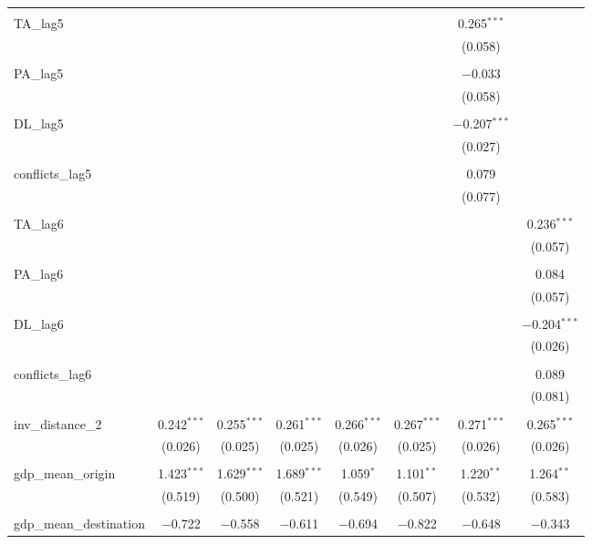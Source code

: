 \begin{table}[!htbp]
\begin{tabular}{@{\extracolsep{5pt}}lccccccc}
  & & & & & & & \\ 
 TA\_lag5 &  &  &  &  &  & 0.265$^{***}$ &  \\ 
  &  &  &  &  &  & (0.058) &  \\ 
  & & & & & & & \\ 
 PA\_lag5 &  &  &  &  &  & $-$0.033 &  \\ 
  &  &  &  &  &  & (0.058) &  \\ 
  & & & & & & & \\ 
 DL\_lag5 &  &  &  &  &  & $-$0.207$^{***}$ &  \\ 
  &  &  &  &  &  & (0.027) &  \\ 
  & & & & & & & \\ 
 conflicts\_lag5 &  &  &  &  &  & 0.079 &  \\ 
  &  &  &  &  &  & (0.077) &  \\ 
  & & & & & & & \\ 
 TA\_lag6 &  &  &  &  &  &  & 0.236$^{***}$ \\ 
  &  &  &  &  &  &  & (0.057) \\ 
  & & & & & & & \\ 
 PA\_lag6 &  &  &  &  &  &  & 0.084 \\ 
  &  &  &  &  &  &  & (0.057) \\ 
  & & & & & & & \\ 
 DL\_lag6 &  &  &  &  &  &  & $-$0.204$^{***}$ \\ 
  &  &  &  &  &  &  & (0.026) \\ 
  & & & & & & & \\ 
 conflicts\_lag6 &  &  &  &  &  &  & 0.089 \\ 
  &  &  &  &  &  &  & (0.081) \\ 
  & & & & & & & \\ 
 inv\_distance\_2 & 0.242$^{***}$ & 0.255$^{***}$ & 0.261$^{***}$ & 0.266$^{***}$ & 0.267$^{***}$ & 0.271$^{***}$ & 0.265$^{***}$ \\ 
  & (0.026) & (0.025) & (0.025) & (0.026) & (0.025) & (0.026) & (0.026) \\ 
  & & & & & & & \\ 
 gdp\_mean\_origin & 1.423$^{***}$ & 1.629$^{***}$ & 1.689$^{***}$ & 1.059$^{*}$ & 1.101$^{**}$ & 1.220$^{**}$ & 1.264$^{**}$ \\ 
  & (0.519) & (0.500) & (0.521) & (0.549) & (0.507) & (0.532) & (0.583) \\ 
  & & & & & & & \\ 
 gdp\_mean\_destination & $-$0.722 & $-$0.558 & $-$0.611 & $-$0.694 & $-$0.822 & $-$0.648 & $-$0.343 \\ 

\end{tabular}
\end{table}
